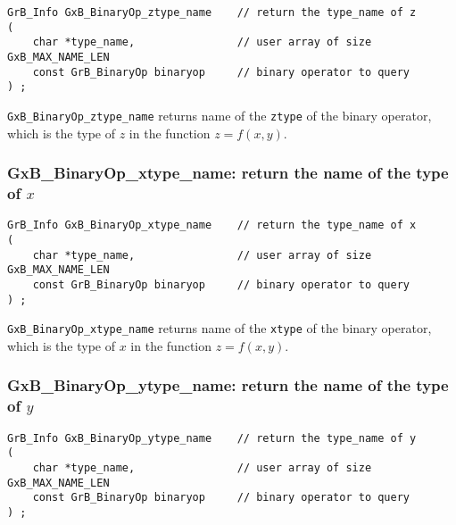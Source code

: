 \documentclass[12pt]{article}
\begin{document}
\begin{mdframed}[userdefinedwidth=6in]
{\footnotesize
\begin{verbatim}
GrB_Info GxB_BinaryOp_ztype_name    // return the type_name of z
(
    char *type_name,                // user array of size GxB_MAX_NAME_LEN
    const GrB_BinaryOp binaryop     // binary operator to query
) ;
\end{verbatim}
} \end{mdframed}

\verb'GxB_BinaryOp_ztype_name'
returns name of the \verb'ztype' of the binary operator, which is the
type of $z$ in the function $z=f(x,y)$.

\subsubsection{{\sf GxB\_BinaryOp\_xtype\_name:} return the name of the type of $x$}
\label{binaryop_xtype_name}

\begin{mdframed}[userdefinedwidth=6in]
{\footnotesize
\begin{verbatim}
GrB_Info GxB_BinaryOp_xtype_name    // return the type_name of x
(
    char *type_name,                // user array of size GxB_MAX_NAME_LEN
    const GrB_BinaryOp binaryop     // binary operator to query
) ;
\end{verbatim}
}\end{mdframed}

\verb'GxB_BinaryOp_xtype_name'
returns name of the \verb'xtype' of the binary operator, which is the
type of $x$ in the function $z=f(x,y)$.

\subsubsection{{\sf GxB\_BinaryOp\_ytype\_name:} return the name of the type of $y$}
\label{binaryop_ytype_name}

\begin{mdframed}[userdefinedwidth=6in]
{\footnotesize
\begin{verbatim}
GrB_Info GxB_BinaryOp_ytype_name    // return the type_name of y
(
    char *type_name,                // user array of size GxB_MAX_NAME_LEN
    const GrB_BinaryOp binaryop     // binary operator to query
) ;
\end{verbatim}
} \end{mdframed}
\end{document}
